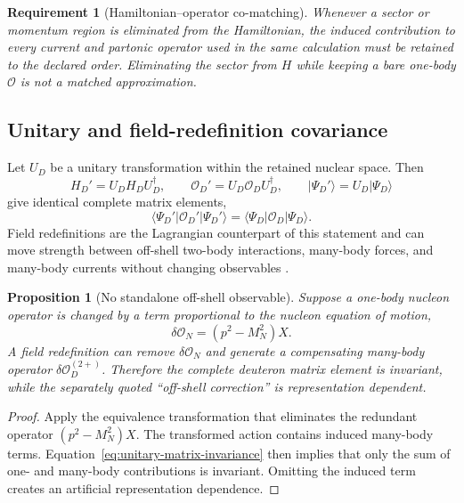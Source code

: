 \documentclass[11pt]{article}
\newtheorem{requirement}[definition]{Requirement}
\newtheorem{proposition}[definition]{Proposition}
\newcommand{\cO}{\mathcal O}
\begin{document}
\begin{requirement}[Hamiltonian--operator co-matching]
\label{req:ham-operator-comatching}
Whenever a sector or momentum region is eliminated from the Hamiltonian, the
induced contribution to every current and partonic operator used in the same
calculation must be retained to the declared order.  Eliminating the sector
from \(H\) while keeping a bare one-body \(\cO\) is not a matched
approximation.
\end{requirement}

\subsection{Unitary and field-redefinition covariance}

Let \(U_D\) be a unitary transformation within the retained nuclear space.
Then
\begin{equation}
 H_D' =U_DH_DU_D^\dagger,
 \qquad
 \cO_D'=U_D\cO_DU_D^\dagger,
 \qquad
 |\Psi_D'\rangle=U_D|\Psi_D\rangle
\label{eq:unitary-covariance}
\end{equation}
give identical complete matrix elements,
\begin{equation}
 \langle\Psi_D'|\cO_D'|\Psi_D'\rangle
 =\langle\Psi_D|\cO_D|\Psi_D\rangle.
\label{eq:unitary-matrix-invariance}
\end{equation}
Field redefinitions are the Lagrangian counterpart of this statement and can
move strength between off-shell two-body interactions, many-body forces, and
many-body currents without changing observables
\cite{FurnstahlHammerTirfessa2001,Krebs2020}.

\begin{proposition}[No standalone off-shell observable]
\label{prop:no-offshell-observable}
Suppose a one-body nucleon operator is changed by a term proportional to the
nucleon equation of motion,
\begin{equation}
 \delta\cO_N=(p^2-M_N^2)X.
\label{eq:eom-offshell-change}
\end{equation}
A field redefinition can remove \(\delta\cO_N\) and generate a compensating
many-body operator \(\delta\cO_D^{(2+)}\).  Therefore the complete deuteron
matrix element is invariant, while the separately quoted ``off-shell
correction'' is representation dependent.
\end{proposition}

\begin{proof}
Apply the equivalence transformation that eliminates the redundant
operator \((p^2-M_N^2)X\).  The transformed action contains induced
many-body terms.  Equation~\eqref{eq:unitary-matrix-invariance} then implies
that only the sum of one- and many-body contributions is invariant.  Omitting
the induced term creates an artificial representation dependence.
\end{proof}
\end{document}

